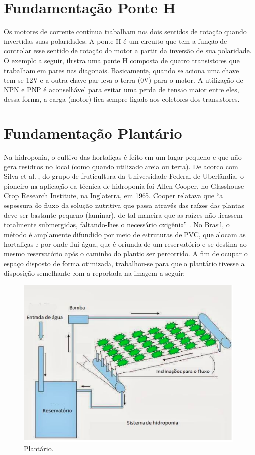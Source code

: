 \section{Fundamentação Ponte H}
Os motores de corrente contínua trabalham nos dois sentidos de rotação quando invertidas suas polaridades. A ponte H é um circuito que tem a função de controlar esse sentido de rotação do motor a partir da inversão de sua polaridade. O exemplo a seguir, ilustra uma ponte H composta de quatro transistores que trabalham em pares nas diagonais. Basicamente, quando se aciona uma chave tem-se 12V e a outra chave-par leva o terra (0V) para o motor. A utilização de  NPN e PNP é aconselhável para evitar uma perda de tensão maior entre eles, dessa forma, a carga (motor) fica sempre ligado aos coletores dos transistores.      

\section{Fundamentação Plantário}
Na hidroponia, o cultivo das hortaliças é feito em um lugar pequeno e que não gera resíduos no local (como quando utilizado areia ou terra). De acordo com Silva et al. \cite{SILVA}, do grupo de fruticultura da Universidade Federal de Uberlândia, o pioneiro na aplicação da técnica de hidroponia foi Allen Cooper, no Glasshouse Crop Research Institute, na Inglaterra, em 1965. Cooper relatava que “a espessura do fluxo da solução nutritiva que passa através das raízes das plantas deve ser bastante pequeno (laminar), de tal maneira que as raízes não ficassem totalmente submergidas, faltando-lhes o necessário oxigênio” \cite{SILVA}. No Brasil, o método é amplamente difundido por meio de estruturas de PVC, que alocam as hortaliças e por onde flui água, que é oriunda de um reservatório e se destina ao mesmo reservatório após o caminho do plantio ser percorrido. A fim de ocupar o espaço disposto de forma otimizada, trabalhou-se para que o plantário tivesse a disposição semelhante com a reportada na imagem a seguir:

\begin{figure}[H]
	\centering
	\includegraphics[width=13cm]{figuras/plantario.png}
	\caption{Plantário.}
	\label{plantario}
\end{figure}

